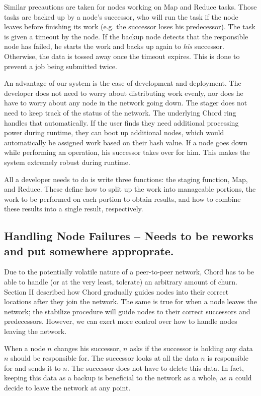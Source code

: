 \documentclass[10pt, conference, compsocconf]{IEEEtran}
\begin{document}
Similar precautions are taken for nodes working on Map and Reduce tasks.  Those tasks are backed up by a node's successor, who will run the task if the node leaves before finishing its work (e.g. the successor loses his predecessor).   The task is given a timeout by the node.  If the backup node detects that the responsible node has failed, he starts the work and backs up again to \emph{his} successor.  Otherwise, the data is tossed away once the timeout expires. This is done to prevent a job being submitted twice.

An advantage of our system is the ease of development and deployment.  The developer does not need to worry about distributing work evenly, nor does he have to worry about any node in the network going down.  The stager does not need to keep track of the status of the network.  The underlying Chord ring handles that automatically.  If the user finds they need additional processing power during runtime, they can boot up additional nodes, which would automatically be assigned work based on their hash value.   If a node goes down while performing an operation, his successor takes over for him.  This makes the system extremely robust during runtime.

All a developer needs to do is write three functions: the staging function, Map, and Reduce.  These define how to split up the work into manageable portions, the work to be performed on each portion to obtain results, and how to combine these results into a single result, respectively. 

\subsection{Handling Node Failures -- Needs to be reworks and put somewhere approprate.}
Due to the potentially volatile nature of a peer-to-peer network, Chord has to be able to handle (or at the very least, tolerate) an arbitrary amount of churn.  Section II described how Chord gradually guides nodes into their correct locations after they join the network.  The same is true for when a node leaves the network; the stabilize procedure will guide nodes to their correct successors and predecessors.  However, we can exert more control over how to handle nodes leaving the network.

When a node $n$ changes his successor, $n$ asks if the successor is holding any data $n$ should be responsible for.  The successor looks at all the data $n$ is responsible for and sends it to $n$.  The successor does not have to delete this data. In fact, keeping this data as a backup is beneficial to the network as a whole, as $n$ could decide to leave the network at any point. 
\end{document}
